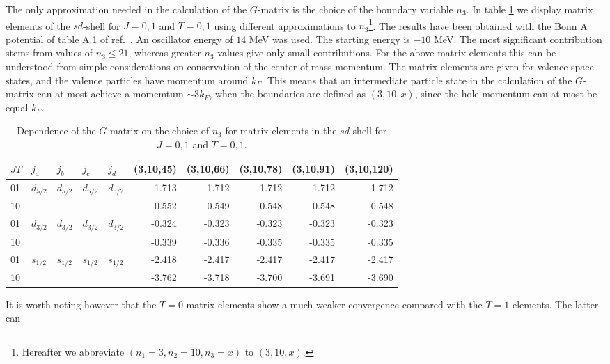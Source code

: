 The only approximation needed in the calculation of the $G$-matrix 
is the choice of the boundary variable $n_3$. In table \ref{tab:n3converge}
we display matrix elements of the $sd$-shell for $J=0,1$ and $T=0,1$ using
different approximations to $n_3$\footnote{Hereafter we abbreviate
$(n_1=3,n_2=10,n_3=x)$ to $(3,10,x)$.}. The results have been obtained
with the Bonn A potential of table A.1 of ref.\ \cite{mac89}.
An oscillator energy of $14$ MeV was used. 
The starting energy is $-10$ MeV.
The most significant contribution stems from values of $n_3\leq 21$, whereas
greater $n_3$ values give only small contributions. For the
above matrix elements this can be understood from simple considerations
on conservation of the center-of-mass momentum. The matrix elements are
given for valence space states, and the valence particles have momentum 
around $k_F$. This means that an intermediate particle state in the 
calculation of the $G$-matrix can at most achieve a momemtum  $\sim 3k_F$,
when the boundaries are defined as $(3,10,x)$, since the hole momentum
can at most be equal $k_F$.  
\begin{table}[hbtp]
\caption{Dependence of the $G$-matrix on the choice of $n_3$ for
matrix elements in the $sd$-shell for $J=0,1$ and $T=0,1$.}
\begin{center}
\begin{tabular}{lllllrrrrr}
\\\hline
$JT$&$j_{a}$&$j_{b}$&$j_{c}$&$j_{d}$&
\multicolumn{1}{c}{(3,10,45)}&
\multicolumn{1}{c}{(3,10,66)}&
\multicolumn{1}{c}{(3,10,78)}&
\multicolumn{1}{c}{(3,10,91)}&
\multicolumn{1}{c}{(3,10,120)}
\\\hline
01&$d_{5/2}$&$d_{5/2}$&$d_{5/2}$&$d_{5/2}$
&-1.713&-1.712&-1.712&-1.712&-1.712\\
10&&&&&-0.552&-0.549&-0.548&-0.548&-0.548\\
01&$d_{3/2}$&$d_{3/2}$&$d_{3/2}$&$d_{3/2}$
&-0.324&-0.323&-0.323&-0.323&-0.323\\
10&&&&&-0.339&-0.336&-0.335&-0.335&-0.335\\
01&$s_{1/2}$&$s_{1/2}$&$s_{1/2}$&$s_{1/2}$
&-2.418&-2.417&-2.417&-2.417&-2.417\\
10&&&&&-3.762&-3.718&-3.700&-3.691&-3.690
\\ \hline
\end{tabular}
\end{center}
\label{tab:n3converge}
\end{table}
It is worth noting however that the $T=0$ matrix elements show a much
weaker convergence compared with the $T=1$ elements. The latter can
